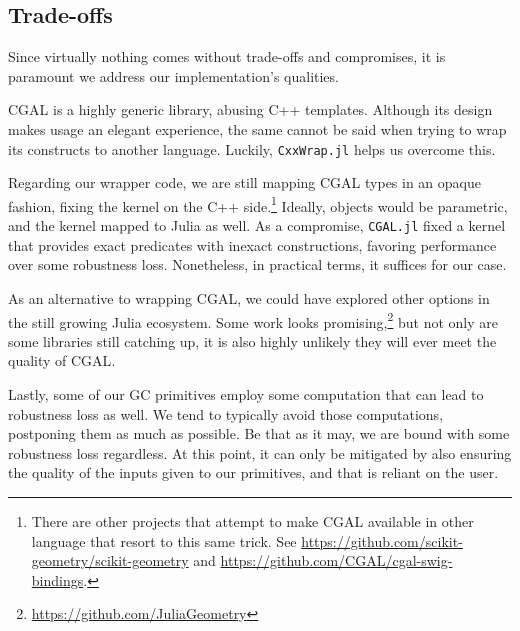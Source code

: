 \subsection{Trade-offs}%
\label{sec:solution.tradeoffs}

Since virtually nothing comes without trade-offs and compromises, it is
paramount we address our implementation's qualities.

\Ac{CGAL} is a highly generic library, abusing C++ templates.  Although its
design makes usage an elegant experience, the same cannot be said when trying to
wrap its constructs to another language. Luckily, \texttt{CxxWrap.jl} helps us
overcome this.

Regarding our wrapper code, we are still mapping \ac{CGAL} types in an opaque
fashion, fixing the kernel on the C++ side.\footnote{There are other projects
that attempt to make \ac{CGAL} available in other language that resort to this
same trick. See \url{https://github.com/scikit-geometry/scikit-geometry} and
\url{https://github.com/CGAL/cgal-swig-bindings}.} Ideally, objects would be
parametric, and the kernel mapped to Julia as well.  As a compromise,
\texttt{CGAL.jl} fixed a kernel that provides exact predicates with inexact
constructions, favoring performance over some robustness loss.  Nonetheless, in
practical terms, it suffices for our case.

As an alternative to wrapping \ac{CGAL}, we could have explored other options in
the still growing Julia ecosystem.  Some work looks
promising,\footnote{\url{https://github.com/JuliaGeometry}} but not only are
some libraries still catching up, it is also highly unlikely they will ever meet
the quality of \ac{CGAL}.

Lastly, some of our \ac{GC} primitives employ some computation that can lead to
robustness loss as well.  We tend to typically avoid those computations,
postponing them as much as possible.  Be that as it may, we are bound with some
robustness loss regardless.  At this point, it can only be mitigated by also
ensuring the quality of the inputs given to our primitives, and that is reliant
on the user.

